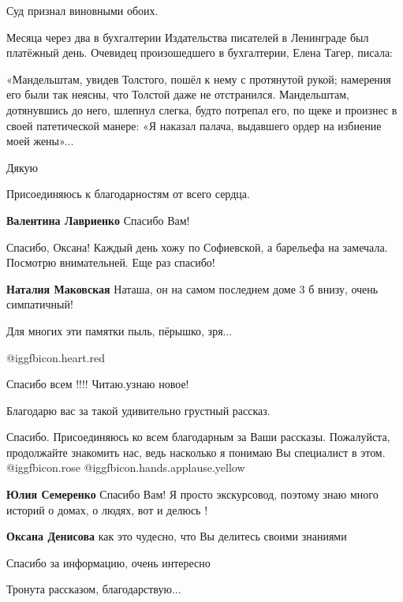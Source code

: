 \begin{itemize}
Суд признал виновными обоих.

Месяца через два в бухгалтерии Издательства писателей в Ленинграде был
платёжный день. Очевидец произошедшего в бухгалтерии, Елена Тагер, писала:

«Мандельштам, увидев Толстого, пошёл к нему с протянутой рукой; намерения его
были так неясны, что Толстой даже не отстранился. Мандельштам, дотянувшись до
него, шлепнул слегка, будто потрепал его, по щеке и произнес в своей
патетической манере: «Я наказал палача, выдавшего ордер на избиение моей
жены»...

Дякую

Присоединяюсь к благодарностям от всего сердца.

\textbf{Валентина Лавриенко} Спасибо Вам!


Спасибо, Оксана! Каждый день хожу по Софиевской, а барельефа на замечала.
Посмотрю внимательней. Еще раз спасибо!

\textbf{Наталия Маковская} Наташа, он на самом последнем доме 3 б внизу, очень симпатичный!

Для многих эти памятки пыль, пёрышко, зря...

@igg{fbicon.heart.red}

Спасибо всем !!!! Читаю.узнаю новое!

Благодарю вас за такой удивительно грустный рассказ.


Спасибо. Присоединяюсь ко всем благодарным за Ваши рассказы. Пожалуйста,
продолжайте знакомить нас, ведь насколько я понимаю Вы специалист в этом.
@igg{fbicon.rose}  @igg{fbicon.hands.applause.yellow} 

\begin{itemize} %
\textbf{Юлия Семеренко} Спасибо Вам! Я просто экскурсовод, поэтому знаю много историй о домах, о людях, вот и делюсь !

\textbf{Оксана Денисова} как это чудесно, что Вы делитесь своими знаниями
\end{itemize} %

Спасибо за информацию, очень интересно

Тронута рассказом, благодарствую...


\end{itemize}
